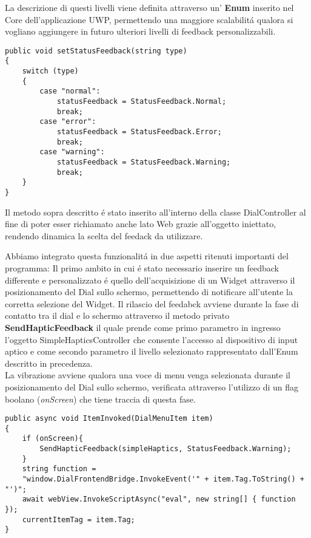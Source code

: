 La descrizione di questi livelli viene definita attraverso un' \textbf{Enum} inserito nel Core dell'applicazione UWP, permettendo una maggiore scalabilitá qualora si vogliano aggiungere in futuro ulteriori livelli di feedback personalizzabili.

\vspace{1.0cm}
\begin{lstlisting}[caption={Selezione feedback corrente},style=javaScriptCode]
public void setStatusFeedback(string type)
{
	switch (type)
	{
		case "normal": 
			statusFeedback = StatusFeedback.Normal;
			break;
		case "error":
			statusFeedback = StatusFeedback.Error;
			break;
		case "warning":
			statusFeedback = StatusFeedback.Warning;
			break;
	}
}
\end{lstlisting} 
\vspace{1.0cm}

Il metodo sopra descritto é stato inserito all'interno della classe DialController al fine di poter esser richiamato anche lato Web grazie all'oggetto iniettato, rendendo dinamica la scelta del feedack da utilizzare.

Abbiamo integrato questa funzionalitá in due aspetti ritenuti importanti del programma:
Il primo ambito in cui é stato necessario inserire un feedback differente e personalizzato é quello dell'acquisizione di un Widget attraverso il posizionamento del Dial sullo schermo, permettendo di notificare all'utente la corretta selezione del Widget.
Il rilascio del feedabck avviene durante la fase di contatto tra il dial e lo schermo attraverso il metodo privato \textbf{SendHapticFeedback} il quale prende come primo parametro in ingresso l'oggetto SimpleHapticsController che consente l'accesso al dispositivo di input aptico e come secondo parametro il livello selezionato rappresentato dall'Enum descritto in precedenza.\\

La vibrazione avviene qualora una voce di menu venga selezionata durante il posizionamento del Dial sullo schermo, verificata attraverso l'utilizzo di un flag boolano (\emph{onScreen}) che tiene traccia di questa fase.

\vspace{1.0cm}
\begin{lstlisting}[caption={Rilascio feedback selezione},style=javaScriptCode]
public async void ItemInvoked(DialMenuItem item)
{
	if (onScreen){
		SendHapticFeedback(simpleHaptics, StatusFeedback.Warning);
	}
	string function = 
	"window.DialFrontendBridge.InvokeEvent('" + item.Tag.ToString() + "')";
	await webView.InvokeScriptAsync("eval", new string[] { function });
	currentItemTag = item.Tag;
} 
\end{lstlisting} 
\vspace{1.0cm}


